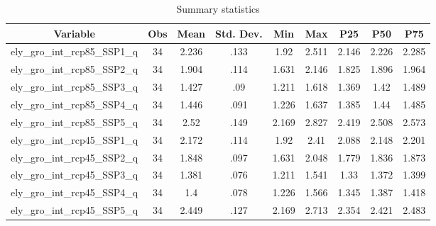 \begin{table}[htbp]\centering \caption{Summary statistics\label{sumstat}}
\begin{tabular}{l c c c c c c c c}\hline\hline
\multicolumn{1}{c}{Variable} & Obs & Mean & Std. Dev.
 & Min & Max & P25 & P50 & P75  \\ \hline
ely\_gro\_int\_rcp85\_SSP1\_q & 34 & 2.236 & .133 & 1.92 & 2.511 & 2.146 & 2.226 & 2.285 \\
ely\_gro\_int\_rcp85\_SSP2\_q & 34 & 1.904 & .114 & 1.631 & 2.146 & 1.825 & 1.896 & 1.964 \\
ely\_gro\_int\_rcp85\_SSP3\_q & 34 & 1.427 & .09 & 1.211 & 1.618 & 1.369 & 1.42 & 1.489 \\
ely\_gro\_int\_rcp85\_SSP4\_q & 34 & 1.446 & .091 & 1.226 & 1.637 & 1.385 & 1.44 & 1.485 \\
ely\_gro\_int\_rcp85\_SSP5\_q & 34 & 2.52 & .149 & 2.169 & 2.827 & 2.419 & 2.508 & 2.573 \\
ely\_gro\_int\_rcp45\_SSP1\_q & 34 & 2.172 & .114 & 1.92 & 2.41 & 2.088 & 2.148 & 2.201 \\
ely\_gro\_int\_rcp45\_SSP2\_q & 34 & 1.848 & .097 & 1.631 & 2.048 & 1.779 & 1.836 & 1.873 \\
ely\_gro\_int\_rcp45\_SSP3\_q & 34 & 1.381 & .076 & 1.211 & 1.541 & 1.33 & 1.372 & 1.399 \\
ely\_gro\_int\_rcp45\_SSP4\_q & 34 & 1.4 & .078 & 1.226 & 1.566 & 1.345 & 1.387 & 1.418 \\
ely\_gro\_int\_rcp45\_SSP5\_q & 34 & 2.449 & .127 & 2.169 & 2.713 & 2.354 & 2.421 & 2.483 \\
\hline\end{tabular}
\end{table}
